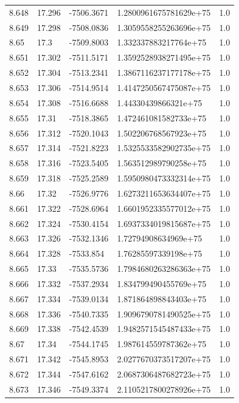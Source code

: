 \begin{tabular}{lllll}
8.648 & 17.296 & -7506.3671 & 1.2800961675781629e+75 & 1.0 \\
8.649 & 17.298 & -7508.0836 & 1.3059558255263696e+75 & 1.0 \\
8.65 & 17.3 & -7509.8003 & 1.332337883217764e+75 & 1.0 \\
8.651 & 17.302 & -7511.5171 & 1.3592528938271495e+75 & 1.0 \\
8.652 & 17.304 & -7513.2341 & 1.3867116237177178e+75 & 1.0 \\
8.653 & 17.306 & -7514.9514 & 1.4147250567475087e+75 & 1.0 \\
8.654 & 17.308 & -7516.6688 & 1.44330439866321e+75 & 1.0 \\
8.655 & 17.31 & -7518.3865 & 1.472461081582733e+75 & 1.0 \\
8.656 & 17.312 & -7520.1043 & 1.502206768567923e+75 & 1.0 \\
8.657 & 17.314 & -7521.8223 & 1.5325533582902735e+75 & 1.0 \\
8.658 & 17.316 & -7523.5405 & 1.563512989790258e+75 & 1.0 \\
8.659 & 17.318 & -7525.2589 & 1.5950980473332314e+75 & 1.0 \\
8.66 & 17.32 & -7526.9776 & 1.6273211653634407e+75 & 1.0 \\
8.661 & 17.322 & -7528.6964 & 1.6601952335577012e+75 & 1.0 \\
8.662 & 17.324 & -7530.4154 & 1.6937334019815687e+75 & 1.0 \\
8.663 & 17.326 & -7532.1346 & 1.72794908634969e+75 & 1.0 \\
8.664 & 17.328 & -7533.854 & 1.76285597339198e+75 & 1.0 \\
8.665 & 17.33 & -7535.5736 & 1.7984680263286363e+75 & 1.0 \\
8.666 & 17.332 & -7537.2934 & 1.834799490455769e+75 & 1.0 \\
8.667 & 17.334 & -7539.0134 & 1.871864898843403e+75 & 1.0 \\
8.668 & 17.336 & -7540.7335 & 1.9096790781490525e+75 & 1.0 \\
8.669 & 17.338 & -7542.4539 & 1.9482571545487433e+75 & 1.0 \\
8.67 & 17.34 & -7544.1745 & 1.987614559787362e+75 & 1.0 \\
8.671 & 17.342 & -7545.8953 & 2.0277670373517207e+75 & 1.0 \\
8.672 & 17.344 & -7547.6162 & 2.0687306487682723e+75 & 1.0 \\
8.673 & 17.346 & -7549.3374 & 2.1105217800278926e+75 & 1.0 \\

\end{tabular}
